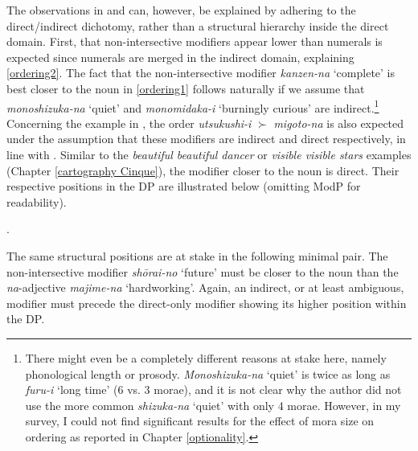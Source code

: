\documentclass [output=book,colorlinks,citecolor=brown]{langscibook}
\begin{document}
The observations in \citet{ayano:2010:revisiting} and \citet{watanabe:2017:attributive} can, however, be explained by adhering to the direct/indirect dichotomy, rather than a structural hierarchy inside the direct domain. First, that non-intersective modifiers appear lower than numerals is expected since numerals are merged in the indirect domain, explaining \ref{ordering2}. The fact that the non-intersective modifier \textit{kanzen-na} `complete’ is best closer to the noun in \ref{ordering1} follows naturally if we assume that \textit{monoshizuka-na} `quiet’ and \textit{monomidaka-i} `burningly curious’ are indirect.\footnote{There might even be a completely different reasons at stake here, namely phonological length or prosody. \textit{Monoshizuka-na} `quiet' is twice as long as \textit{furu-i} `long time' (6 vs. 3 morae), and it is not clear why the author did not use the more common \textit{shizuka-na} `quiet' with only 4 morae. However, in my survey, I could not find significant results for the effect of mora size on ordering as reported in Chapter \ref{optionality}.} Concerning the example in \citet{watanabe:2017:attributive}, the order \textit{utsukushi-i} $\succ$ \textit{migoto-na} is also expected under the assumption that these modifiers are indirect and direct respectively, in line with \citet[22–24]{cinque:2010:adj}. Similar to the \textit{beautiful beautiful dancer} or \textit{visible visible stars} examples (Chapter \ref{cartography Cinque}), the modifier closer to the noun is direct. Their respective positions in the DP are illustrated below (omitting ModP for readability). %


\ex. 

The same structural positions are at stake in the following minimal pair. The non-intersective modifier \textit{shōrai-no} `future' must be closer to the noun than the \textit{na}-adjective \textit{majime-na} `hardworking'. Again, an indirect, or at least ambiguous, modifier must precede the direct-only modifier showing its higher position within the DP. %
\end{document}
